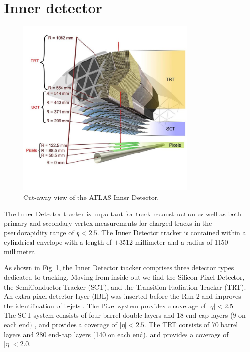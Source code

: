 \section{Inner detector}
\label{sec:inner}

\begin{figure}[htbp]
    \centering
    \includegraphics[width=0.8\textwidth]{chapters/c4/figures/inner}
    \caption{Cut-away view of the ATLAS Inner Detector.}
    \label{fig:inner}
\end{figure}

\par The Inner Detector tracker is important for track reconstruction as well as both primary and secondary vertex measurements for charged tracks in the pseudorapidity range of $ \eta< 2.5$. The Inner Detector tracker is contained within a cylindrical envelope with a length of $\pm$3512 millimeter and a radius of 1150 millimeter.

\par As shown in Fig~\ref{fig:inner}, the Inner Detector tracker comprises three detector types dedicated to tracking. Moving from inside out we find the Silicon Pixel Detector, the SemiConductor Tracker (SCT), and the Transition Radiation Tracker (TRT). An extra pixel detector layer (IBL)\cite{Capeans:1291633} was inserted before the Run 2 and improves the identification of b-jets \cite{ATL-PHYS-PUB-2015-022}. The Pixel system provides a coverage of $|\eta|<2.5$. The SCT system consists of four barrel double layers and 18 end-cap layers (9 on each end) \cite{Aad:2014mta}, and provides a coverage of $|\eta| < 2.5$. The TRT consists of 70 barrel layers and 280 end-cap layers (140 on each end), and provides a coverage of $|\eta| < 2.0$\cite{Aad:2014mta}.

